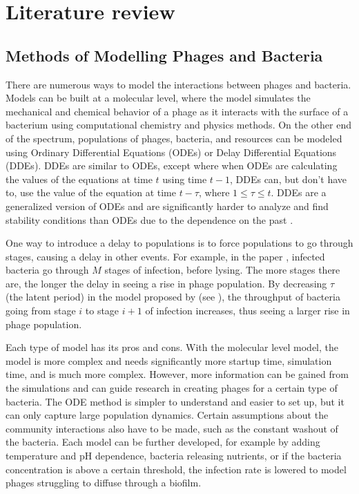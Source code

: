 \chapter{Literature review}
\label{LR}

\section{Methods of Modelling Phages and Bacteria}
There are numerous ways to model the interactions between phages and bacteria.
Models can be built at a molecular level, where the model simulates the mechanical and chemical behavior of a phage as it interacts with the surface of a bacterium using computational chemistry and physics methods.
On the other end of the spectrum, populations of phages, bacteria, and resources can be modeled using Ordinary Differential Equations (ODEs) or Delay Differential Equations (DDEs).
DDEs are similar to ODEs, except where when ODEs are calculating the values of the equations at time $t$ using time $t-1$, DDEs can, but don't have to, use the value of the equation at time $t-\tau$, where $1 \leq \tau \leq t$. 
DDEs are a generalized version of ODEs and are significantly harder to analyze and find stability conditions than ODEs due to the dependence on the past \cite{liExploringComplicatedBehaviors2023}. 

One way to introduce a delay to populations is to force populations to go through stages, causing a delay in other events. 
For example, in the paper \citet{gengUsingBacterialPopulation2024}, infected bacteria go through $M$ stages of infection, before lysing. 
The more stages there are, the longer the delay in seeing a rise in phage population. 
By decreasing $\tau$ (the latent period) in the model proposed by \citet{gengUsingBacterialPopulation2024} (see ), the throughput of bacteria going from stage $i$ to stage $i+1$ of infection increases, thus seeing a larger rise in phage population. 

Each type of model has its pros and cons.
With the molecular level model, the model is more complex and needs significantly more startup time, simulation time, and is much more complex.
However, more information can be gained from the simulations and can guide research in creating phages for a certain type of bacteria.
The ODE method is simpler to understand and easier to set up, but it can only capture large population dynamics.
Certain assumptions about the community interactions also have to be made, such as the constant washout of the bacteria. 
Each model can be further developed, for example by adding temperature and pH dependence, bacteria releasing nutrients, or if the bacteria concentration is above a certain threshold, the infection rate is lowered to model phages struggling to diffuse through a biofilm. 

